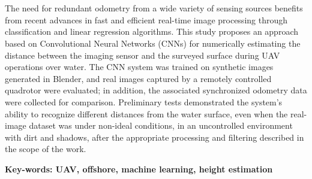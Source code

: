 \section*{} 
The need for redundant odometry from a wide variety of sensing sources benefits from recent advances in fast and efficient real-time image processing through classification and linear regression algorithms. This study proposes an approach based on Convolutional Neural Networks (CNNs) for numerically estimating the distance between the imaging sensor and the surveyed surface during UAV operations over water. The CNN system was trained on synthetic images generated in Blender, and real images captured by a remotely controlled quadrotor were evaluated; in addition, the associated synchronized odometry data were collected for comparison. Preliminary tests demonstrated the system’s ability to recognize different distances from the water surface, even when the real-image dataset was under non-ideal conditions, in an uncontrolled environment with dirt and shadows, after the appropriate processing and filtering described in the scope of the work.

{\bf Key-words: UAV, offshore, machine learning, height estimation} 